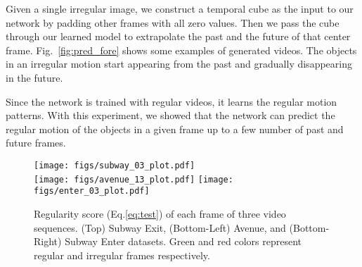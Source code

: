 \documentclass[10pt,twocolumn,letterpaper]{article}
\begin{document}
Given a single irregular image, we construct a temporal cube as the input to our network by padding other frames with all zero values. 
Then we pass the cube through our learned model to extrapolate the past and the future of that center frame.
Fig.~\ref{fig:pred_fore} shows some examples of generated videos. The objects in an irregular motion start appearing from the past and gradually disappearing in the future.

Since the network is trained with regular videos, it learns the regular motion patterns. With this experiment, we showed that the network can predict the regular motion of the objects in a given frame up to a few number of past and future frames.


\begin{figure*}[t]
	\centering
	\texttt{[image: figs/subway\_03\_plot.pdf]}\\
	\vspace{2mm}
	\texttt{[image: figs/avenue\_13\_plot.pdf]}
	\texttt{[image: figs/enter\_03\_plot.pdf]}
	\caption{Regularity score (Eq.\ref{eq:test}) of each frame of three video sequences. (Top) Subway Exit, (Bottom-Left) Avenue, and (Bottom-Right) Subway Enter datasets. Green and red colors represent regular and irregular frames respectively.}
	\label{fig:plot_recon_cost}
\end{figure*}
\end{document}

